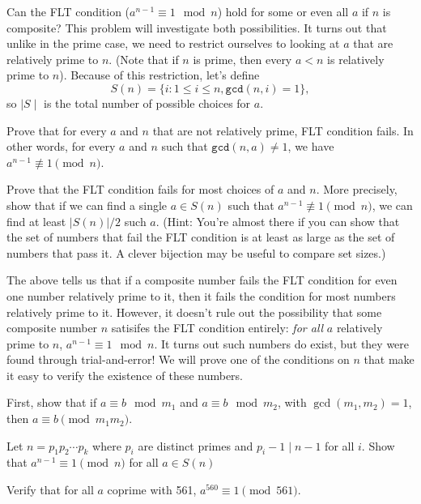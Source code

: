 Can the FLT condition ($a^{n-1} \equiv 1 \mod n$) hold for some or even all $a$ if $n$ is composite? This problem will investigate both possibilities. 
It turns out that unlike in the prime case, we need to restrict ourselves to looking at $a$ that are relatively prime to $n$. (Note that if $n$ is prime, then every $a<n$ is relatively prime to $n$). Because of this restriction, let's define $$S(n) =  \{i: 1 \leq i \leq n, \texttt{gcd}(n,i) = 1\},$$ so $\mid S \mid$ is the total number of possible choices for $a$.
\begin{Parts}
\Part Prove that for every $a$ and $n$ that are not relatively prime, FLT condition fails. In other words, for every $a$ and $n$ such that $\texttt{gcd}(n,a) \neq 1$, we have $a^{n-1} \not\equiv 1 \pmod{n}$.

    \Part Prove that the FLT condition fails for most choices of $a$ and $n$. More precisely, show that if we can find a single $a \in S(n)$ such that $a^{n-1} \not \equiv 1 \pmod{n}$, we can find at least $|S(n)|/2$ such $a$. (Hint: You're almost there if you can show that the set of numbers that fail the FLT condition is at least as large as the set of numbers that pass it. A clever bijection may be useful to compare set sizes.)

\end{Parts}
The above tells us that if a composite number fails the FLT condition for even one number relatively prime to it, then it fails the condition for most numbers relatively prime to it. However, it doesn't rule out the possibility that some composite number $n$ satisifes the FLT condition entirely: \emph{for all} $a$ relatively prime to $n$, $a^{n-1}\equiv 1 \mod n$. It turns out such numbers do exist, but they were found through trial-and-error! We will prove one of the conditions on $n$ that make it easy to verify the existence of these numbers.
\begin{ResumeParts}
    \Part First, show that if $a \equiv b \mod m_1$ and $a \equiv b \mod m_2$, with $\gcd(m_1, m_2)=1$, then $a \equiv b \pmod{m_1 m_2}$.
    
    \Part Let $n = p_1 p_2 \cdots p_k$ where $p_i$ are distinct primes and $p_i - 1 \mid n - 1$ for all $i$. Show that $a^{n-1} \equiv 1 \pmod{n}$ for all $a \in S(n)$ %
    

    \Part Verify that for all $a$ coprime with 561, $a^{560} \equiv 1 \pmod{561}$.
\end{ResumeParts}


